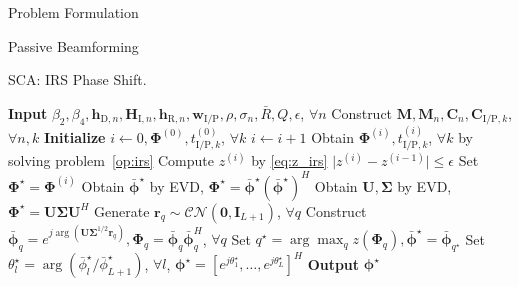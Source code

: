 \documentclass[journal]{IEEEtran}
\begin{document}
\begin{section}{Problem Formulation}
\begin{subsection}{Passive Beamforming}
\begin{algorithm}[!t]
				\caption{SCA: IRS Phase Shift.}
				\label{al:irs}
				\begin{algorithmic}[1]
					\State \textbf{Input} $\beta_2,\beta_4,\boldsymbol{h}_{\mathrm{D},n},\boldsymbol{H}_{\mathrm{I},n},\boldsymbol{h}_{\mathrm{R},n},\boldsymbol{w}_{\mathrm{I/P}},\rho,\sigma_n,\bar{R},Q,\epsilon$, $\forall n$
					\State Construct $\boldsymbol{M},\boldsymbol{M}_n,\boldsymbol{C}_{n},\boldsymbol{C}_{\mathrm{I/P},k}$, $\forall n,k$
					\State \textbf{Initialize} $i \gets 0,\boldsymbol{\Phi}^{(0)},t_{\mathrm{I/P},k}^{(0)}$, $\forall k$
					\Repeat
						\State $i \gets i + 1$
						\State Obtain $\boldsymbol{\Phi}^{(i)},t_{\mathrm{I/P},k}^{(i)}$, $\forall k$ by solving problem~\eqref{op:irs}
						\State Compute $z^{(i)}$ by \eqref{eq:z_irs}
					\Until $\lvert z^{(i)}-z^{(i-1)} \rvert \le \epsilon$
					\State Set $\boldsymbol{\Phi}^{\star}=\boldsymbol{\Phi}^{(i)}$
						\State Obtain $\bar{\boldsymbol{\phi}}^\star$ by EVD, $\boldsymbol{\Phi}^{\star}=\bar{\boldsymbol{\phi}}^\star(\bar{\boldsymbol{\phi}}^\star)^H$
					\Else
						\State Obtain $\boldsymbol{U},\boldsymbol{\Sigma}$ by EVD, $\boldsymbol{\Phi}^{\star}=\boldsymbol{U}\boldsymbol{\Sigma}\boldsymbol{U}^H$
						\State Generate $\boldsymbol{r}_q \sim \mathcal{CN}(\boldsymbol{0},\boldsymbol{I}_{L+1})$, $\forall q$
						\State Construct $\bar{\boldsymbol{\phi}}_q=e^{j\arg\left(\boldsymbol{U}\boldsymbol{\Sigma}^{1/2}\boldsymbol{r}_q\right)},\boldsymbol{\Phi}_q=\bar{\boldsymbol{\phi}}_q\bar{\boldsymbol{\phi}}_q^H$, $\forall q$
						\State Set $q^{\star}=\arg\max_q{z(\boldsymbol{\Phi}_q)},\bar{\boldsymbol{\phi}}^\star=\bar{\boldsymbol{\phi}}_{q^{\star}}$
					\EndIf
					\State Set $\theta_l^\star=\arg(\bar{\phi}_l^\star/\bar{\phi}_{L+1}^\star)$, $\forall l$, $\boldsymbol{\phi}^{\star}=[e^{j\theta_1^\star},\dots,e^{j\theta_L^\star}]^H$
					\State \textbf{Output} $\boldsymbol{\phi}^{\star}$
				\end{algorithmic}
			\end{algorithm}
		\end{subsection}


\end{section}
\end{document}
